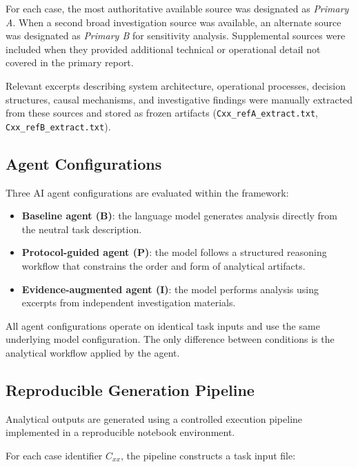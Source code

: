 For each case, the most authoritative available source was designated as
\emph{Primary A}. When a second broad investigation source was available,
an alternate source was designated as \emph{Primary B} for sensitivity
analysis. Supplemental sources were included when they provided additional
technical or operational detail not covered in the primary report.

Relevant excerpts describing system architecture, operational processes,
decision structures, causal mechanisms, and investigative findings were
manually extracted from these sources and stored as frozen artifacts
(\texttt{Cxx\_refA\_extract.txt}, \texttt{Cxx\_refB\_extract.txt}).

\subsection{Agent Configurations}

Three AI agent configurations are evaluated within the framework:

\begin{itemize}

\item \textbf{Baseline agent (B)}: the language model generates analysis
directly from the neutral task description.

\item \textbf{Protocol-guided agent (P)}: the model follows a structured
reasoning workflow that constrains the order and form of analytical
artifacts.

\item \textbf{Evidence-augmented agent (I)}: the model performs analysis
using excerpts from independent investigation materials.

\end{itemize}

All agent configurations operate on identical task inputs and use the same
underlying model configuration. The only difference between conditions is
the analytical workflow applied by the agent.

\subsection{Reproducible Generation Pipeline}

Analytical outputs are generated using a controlled execution pipeline
implemented in a reproducible notebook environment.

For each case identifier \(C_{xx}\), the pipeline constructs a task input
file:

